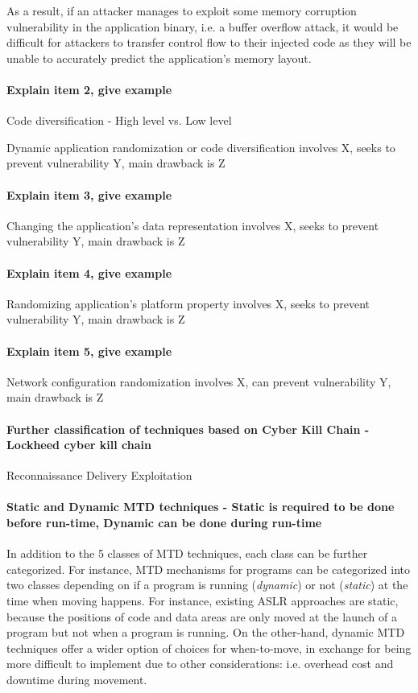 As a result, if an attacker manages to exploit some memory corruption vulnerability in the application binary, i.e. a buffer overflow attack, it would be difficult for attackers to transfer control flow to their injected code as they will be unable to accurately predict the application's memory layout. 

\paragraph{Explain item 2, give example}
Code diversification - High level vs. Low level

Dynamic application randomization or code diversification involves X, seeks to prevent vulnerability Y, main drawback is Z
\paragraph{Explain item 3, give example}
Changing the application's data representation involves X, seeks to prevent vulnerability Y, main drawback is Z
\paragraph{Explain item 4, give example}
Randomizing application's platform property involves X, seeks to prevent vulnerability Y, main drawback is Z
\paragraph{Explain item 5, give example}
Network configuration randomization involves X, can prevent vulnerability Y, main drawback is Z

\paragraph{Further classification of techniques based on Cyber Kill Chain - Lockheed cyber kill chain}
Reconnaissance
Delivery 
Exploitation

\paragraph{Static and Dynamic MTD techniques - Static is required to be done before run-time, Dynamic can be done during run-time}
In addition to the 5 classes of MTD techniques, each class can be further categorized. For instance, MTD mechanisms for programs can be categorized into two classes depending on if a program is running (\textit{dynamic}) or not (\textit{static}) at the time when moving happens.
For instance, existing ASLR approaches are static, because the positions of code and data areas are only moved at the launch of a program but not when a program is running.
On the other-hand, dynamic MTD techniques offer a wider option of choices for when-to-move,
in exchange for being more difficult to implement due to other considerations: i.e. overhead cost and downtime during movement.